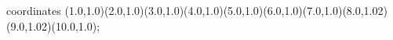 					coordinates { (1.0,1.0)(2.0,1.0)(3.0,1.0)(4.0,1.0)(5.0,1.0)(6.0,1.0)(7.0,1.0)(8.0,1.02)(9.0,1.02)(10.0,1.0)};